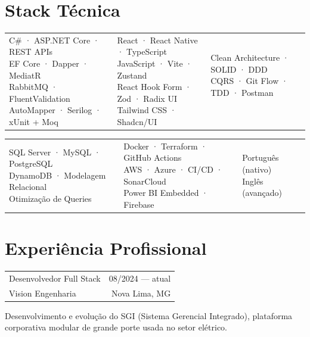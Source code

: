 \documentclass[10pt, a4paper]{article}
\makeatletter
\newcommand{\skillbox}[2]{%
	\begin{tcolorbox}[
		colback=cvgraybg, colframe=cvgraybdr,
		boxrule=0.5pt, arc=3pt,
		left=6pt, right=6pt, top=5pt, bottom=5pt,
		fontupper={\sansFont},
		]
		{\monoFont\fontsize{6.5}{8}\selectfont\color{cvmuted}%
			\addfontfeatures{LetterSpace=9}\MakeUppercase{#1}}%
		\vspace{3pt}\par
		{\fontsize{8.5}{13}\selectfont\color{cvgreendark}#2}
	\end{tcolorbox}%
}
\newcommand{\expentry}[4]{%
	\begin{tabularx}{\linewidth}{@{}X r@{}}
		{\sansFont\fontsize{11}{13}\selectfont\fontseries{m}\selectfont\color{cvdark}#1}
		& {\monoFont\fontsize{7.5}{9}\selectfont\color{cvmuted}#3} \\[-2pt]
		{\sansFont\fontsize{9}{11}\selectfont\fontseries{m}\selectfont\color{cvgreen}#2}
		& {\sansFont\fontsize{8}{10}\selectfont\color{cvmuted}#4} \\
	\end{tabularx}%
	\vspace{2pt}%
}
\makeatother
\begin{document}
	\section{Stack Técnica}
	
	\begin{tabularx}{\linewidth}{@{}XXX@{}}
		\skillbox{Backend}{C\# · ASP.NET Core · REST APIs\\EF Core · Dapper · MediatR\\RabbitMQ · FluentValidation\\AutoMapper · Serilog · xUnit + Moq}
		&
		\skillbox{Frontend \& Mobile}{React · React Native · TypeScript\\JavaScript · Vite · Zustand\\ React Hook Form · Zod · Radix UI\\Tailwind CSS · Shadcn/UI}
		&
		\skillbox{Arquitetura \& QA}{Clean Architecture · SOLID · DDD\\CQRS · Git Flow · TDD · Postman\\ \\}
	\end{tabularx}
	
	\vspace{5pt}
	
	\begin{tabularx}{\linewidth}{@{}XXX@{}}
		\skillbox{Banco de Dados}{SQL Server · MySQL · PostgreSQL\\DynamoDB · Modelagem Relacional\\Otimização de Queries}
		&
		\skillbox{DevOps \& Cloud}{Docker · Terraform · GitHub Actions\\AWS · Azure · CI/CD · SonarCloud\\Power BI Embedded · Firebase}
		&
		\skillbox{Idiomas}{Português (nativo)\\Inglês (avançado)\\}
	\end{tabularx}
	
	\section{Experiência Profissional}
	
	\expentry{Desenvolvedor Full Stack}{Vision Engenharia}{08/2024 — atual}{Nova Lima, MG}
	
	{\fontsize{8.5}{12}\selectfont\color{cvmuted}%
		Desenvolvimento e evolução do SGI (Sistema Gerencial Integrado), plataforma corporativa modular de grande porte usada no setor elétrico.%
	}\par\vspace{2pt}
	
\end{document}

